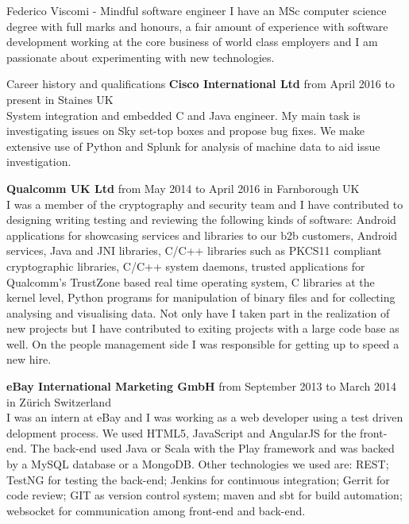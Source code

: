 \documentclass{resume}
\begin{document}
	\begin{rSection}{Federico Viscomi - Mindful software engineer}
		I have an MSc computer science degree with full marks and honours, 
		a fair amount of experience with software development working at the core business of world class employers 
		and I am passionate about experimenting with new technologies.
	\end{rSection}
	\begin{rSection}{Career history and qualifications}
		{\bf Cisco International Ltd} from April 2016 to present in Staines UK\\
			System integration and embedded C and Java engineer. 
			My main task is investigating issues on Sky set-top boxes and propose bug fixes. 
			We make extensive use of Python and Splunk for analysis of machine data to aid issue investigation.

		{\bf Qualcomm UK Ltd} from May 2014 to April 2016 in Farnborough UK\\
			I was a member of the cryptography and security team and I have contributed to designing writing testing and reviewing the following kinds of software:
			Android applications for showcasing services and libraries to our b2b customers,
			Android services, 
			Java and JNI libraries, 
			C/C++ libraries such as PKCS11 compliant cryptographic libraries,
			C/C++ system daemons,
			trusted applications for Qualcomm's TrustZone based real time operating system,
			C libraries at the kernel level,
			Python programs for manipulation of binary files and for collecting analysing and visualising data.	
			Not only have I taken part in the realization of new projects but I have contributed to exiting projects with a large code base as well.
			On the people management side I was responsible for getting up to speed a new hire.

		{\bf eBay International Marketing GmbH} from September 2013 to March 2014 in Z\"urich Switzerland\\
			I was an intern at eBay and I was working as a web developer using a test driven delopment process. 
			We used HTML5, JavaScript and AngularJS for the front-end. 
			The back-end used Java or Scala with the Play framework and was backed by a MySQL database or a MongoDB. 
			Other technologies we used are: 
			REST; TestNG for testing the back-end; 
			Jenkins for continuous integration; 
			Gerrit for code review; 
			GIT as version control system; 
			maven and sbt for build automation;
			websocket for communication among front-end and back-end.	  
	    

\end{rSection}
\end{document}
